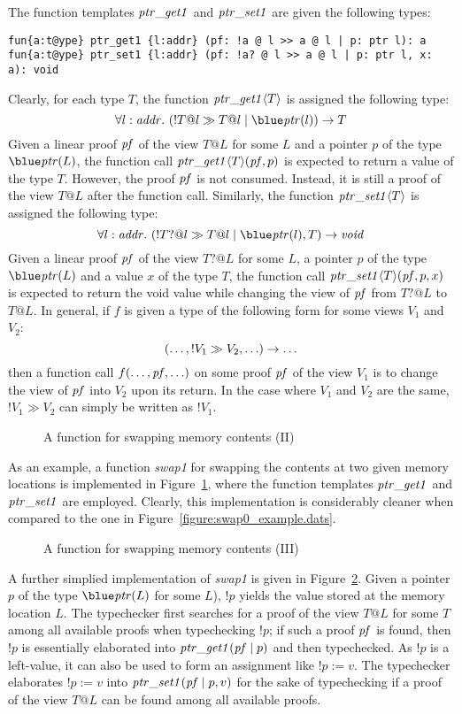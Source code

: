 The function templates ${\it ptr\_get1}$ and ${\it ptr\_set1}$ are given
the following types:
\begin{verbatim}
fun{a:t@ype} ptr_get1 {l:addr} (pf: !a @ l >> a @ l | p: ptr l): a
fun{a:t@ype} ptr_set1 {l:addr} (pf: !a? @ l >> a @ l | p: ptr l, x: a): void
\end{verbatim}
Clearly, for each type $T$, the function
${\it ptr\_get1}\langle T\rangle$ is assigned the following type:
\[
\forall l:\saddr.~(!T@l \gg T@l \mid \tptr(l))\timp T
\]
Given a linear proof ${\it pf}$ of the view $T@L$ for some $L$ and a
pointer $p$ of the type $\tptr(L)$, the function call ${\it
ptr\_get1}\langle T\rangle({\it pf}, p)$ is expected to return a
value of the type $T$. However, the proof ${\it pf}$ is not
consumed. Instead, it is still a proof of the view $T@L$ after the function
call. Similarly, the function
${\it ptr\_set1}\langle T\rangle$ is assigned the following type:
\[
\forall l:\saddr.~(!T?@l \gg T@l \mid \tptr(l), T)\timp\tvoid
\]
Given a linear proof ${\it pf}$ of the view $T?@L$ for some $L$, a pointer
$p$ of the type $\tptr(L)$ and a value $x$ of the type $T$, the function
call ${\it ptr\_set1}\langle T\rangle({\it pf}, p, x)$ is expected to
return the void value while changing the view of ${\it pf}$ from $T?@L$ to
$T@L$.  In general, if $f$ is given a type of the following form for some
views $V_1$ and $V_2$: $$(\ldots,!V_1\gg V_2,\ldots)\rightarrow\ldots$$ then a
function call $f(\ldots,{\it pf},\ldots)$ on some proof ${\it pf}$ of the
view $V_1$ is to change the view of ${\it pf}$ into $V_2$ upon its return.
In the case where $V_1$ and $V_2$ are the same, $!V_1\gg V_2$ can simply be
written as $!V_1$.
\begin{figure}

\caption{A function for swapping memory contents (II)}
\label{figure:swap1_example.dats}
\end{figure}
As an example, a function {\it swap1} for swapping the contents at two
given memory locations is implemented in
Figure~\ref{figure:swap1_example.dats}, where the function templates ${\it
ptr\_get1}$ and ${\it ptr\_set1}$ are employed.  Clearly, this
implementation is considerably cleaner when compared to the one in
Figure~\ref{figure:swap0_example.dats}.

\begin{figure}

\caption{A function for swapping memory contents (III)}
\label{figure:swap1_alt_example.dats}
\end{figure}
A further simplied implementation of {\it swap1} is given in
Figure~\ref{figure:swap1_alt_example.dats}. Given a pointer $p$ of the type
$\tptr(L)$ for some $L$), $!p$ yields the value stored at the memory
location $L$.  The typechecker first searches for a proof of the view $T@L$
for some $T$ among all available proofs when typechecking $!p$; if such a
proof ${\it pf}$ is found, then $!p$ is essentially elaborated into ${\it
ptr\_get1}({\it pf} \mid p)$ and then typechecked. As $!p$ is a left-value, it can
also be used to form an assignment like $!p := v$. The typechecker
elaborates $!p := v$ into ${\it ptr\_set1}({\it pf} \mid p, v)$ for the sake of
typechecking if a proof of the view $T@L$ can be found among all available
proofs.

